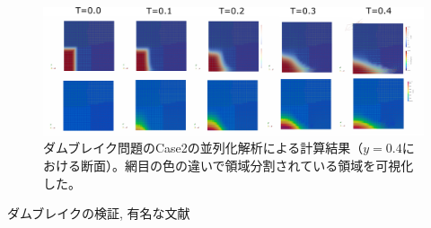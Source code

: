 \begin{figure}[H]
	\centering
	\includegraphics[width=18truecm]{pics/3d-dambreak-parallel/result-partition4.pdf}
	\caption{ダムブレイク問題のCase2の並列化解析による計算結果（$y=0.4$における断面）。網目の色の違いで領域分割されている領域を可視化した。}
	\label{fig:3d-dambreak-parallel-result}
\end{figure}

ダムブレイクの検証\cite{Okumura2009}, 
有名な文献\cite{Koshizuka1996}
